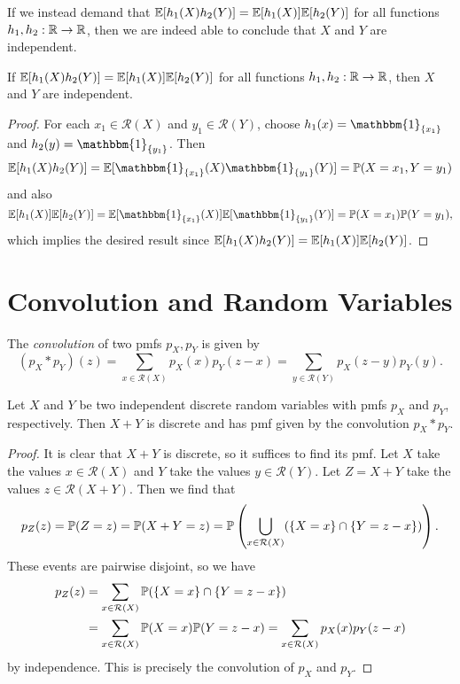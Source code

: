 \begin{remark}
  If we instead demand that
  $\mathbb{E}[h_1(X)h_2(Y)] = \mathbb{E}[h_1(X)] \mathbb{E}[h_2(Y)]$
  for all functions $h_1, h_2 : \mathbb{R} \to \mathbb{R}$,
  then we are indeed able to conclude that
  $X$ and $Y$ are independent.
\end{remark}

\begin{prop}
  If $\mathbb{E}[h_1(X)h_2(Y)] = \mathbb{E}[h_1(X)] \mathbb{E}[h_2(Y)]$
  for all functions $h_1, h_2 : \mathbb{R} \to \mathbb{R}$, then $X$ and $Y$
  are independent.
\end{prop}

\begin{proof}
  For each $x_1 \in \mathcal{R}(X)$ and $y_1 \in \mathcal{R}(Y)$,
  choose $h_1(x) = \mathbbm{1}_{\{x_1\}}$
  and $h_2(y) = \mathbbm{1}_{\{y_1\}}$. Then
  \[
    \EE[h_1(X)h_2(Y)] = \EE[\mathbbm{1}_{\{x_1\}}(X) \mathbbm{1}_{\{y_1\}}(Y)]
    = \PP(X = x_1, Y = y_1)
  \]
  and also
  \[
    \EE[h_1(X)] \EE[h_2(Y)]
    = \EE[\mathbbm{1}_{\{x_1\}}(X)] \EE[\mathbbm{1}_{\{y_1\}}(Y)]
    = \PP(X = x_1) \PP(Y = y_1),
  \]
  which implies the desired result since
  $\mathbb{E}[h_1(X)h_2(Y)] = \mathbb{E}[h_1(X)] \mathbb{E}[h_2(Y)]$.
\end{proof}

\section{Convolution and Random Variables}

\begin{definition}
  The \emph{convolution} of two pmfs
  $p_X, p_Y$ is given by
  \[
    (p_X * p_Y)(z)
    = \sum_{x \in \mathcal{R}(X)} p_X(x) p_Y(z - x)
    = \sum_{y \in \mathcal{R}(Y)} p_X(z - y) p_Y(y).
  \]
\end{definition}

\begin{prop}
  Let $X$ and $Y$ be two independent discrete
  random variables with pmfs $p_X$ and $p_Y$, respectively.
  Then $X + Y$ is discrete and has pmf given by
  the convolution $p_X * p_Y$.
\end{prop}

\begin{proof}
  It is clear that $X + Y$ is discrete, so it suffices
  to find its pmf.
  Let $X$ take the values $x \in \mathcal{R}(X)$ and
  $Y$ take the values $y \in \mathcal{R}(Y)$.
  Let $Z = X + Y$ take the values
  $z \in \mathcal{R}(X + Y)$. Then we find that
  \[
    p_Z(z) = \mathbb{P}(Z = z)
    = \mathbb{P}(X + Y = z)
    = \mathbb{P}\left(
      \bigcup_{x \in \mathcal{R}(X)} (\{X = x\} \cap \{Y = z - x\})
    \right).
  \]
  These events are pairwise disjoint, so we have
  \begin{align*}
    p_Z(z)
    &= \sum_{x \in \mathcal{R}(X)} \mathbb{P}(\{X = x\} \cap \{Y = z - x\}) \\
    &= \sum_{x \in \mathcal{R}(X)} \mathbb{P}(X = x) \mathbb{P}(Y = z - x)
    = \sum_{x \in \mathcal{R}(X)} p_X(x) p_Y(z - x)
  \end{align*}
  by independence. This is precisely the
  convolution of $p_X$ and $p_Y$.
\end{proof}

